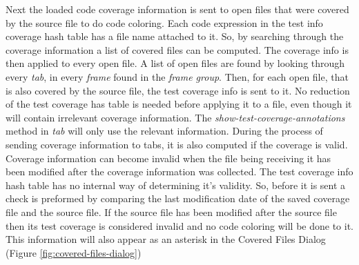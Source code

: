 Next the loaded code coverage information is sent to open files that were covered by the source file to do code coloring. Each code expression in the test info coverage hash table has a file name attached to it. So, by searching through the coverage information a list of covered files can be computed. The coverage info is then applied to every open file. A list of open files are found by looking through every \emph{tab}, in every \emph{frame} found in the \emph{frame group}. Then, for each open file, that is also covered by the source file, the test coverage info is sent to it. No reduction of the test coverage has table is needed before applying it to a file, even though it will contain irrelevant coverage information. The \emph{show-test-coverage-annotations} method in \emph{tab} will only use the relevant information. During the process of sending coverage information to tabs, it is also computed if the coverage is valid. Coverage information can become invalid when the file being receiving it has been modified after the coverage information was collected. The test coverage info hash table has no internal way of determining it's validity. So, before it is sent a check is preformed by comparing the last modification date of the saved coverage file and the source file. If the source file has been modified after the source file then its test coverage is considered invalid and no code coloring will be done to it. This information will also appear as an asterisk in the Covered Files Dialog (Figure \ref{fig:covered-files-dialog})

